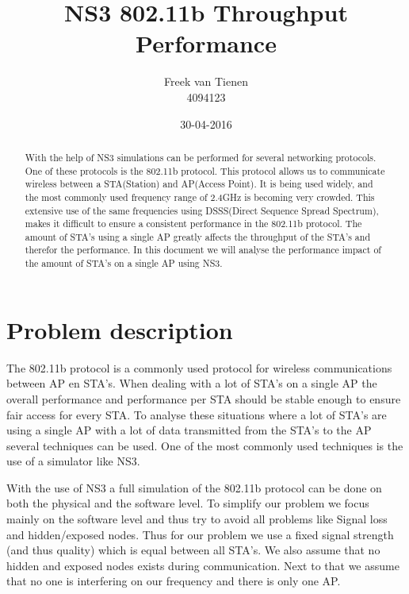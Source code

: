 \documentclass[]{article}
\begin{document}


\title{NS3 802.11b Throughput Performance}
\author{Freek van Tienen \\ 4094123}
\date{30-04-2016}
\maketitle

\begin{abstract}
With the help of NS3 simulations can be performed for several networking protocols.
One of these protocols is the 802.11b protocol.
This protocol allows us to communicate wireless between a STA(Station) and AP(Access Point).
It is being used widely, and the most commonly used frequency range of 2.4GHz is becoming very crowded.
This extensive use of the same frequencies using DSSS(Direct Sequence Spread Spectrum), makes it difficult to ensure a consistent performance in the 802.11b protocol.
The amount of STA's using a single AP greatly affects the throughput of the STA's and therefor the performance.
In this document we will analyse the performance impact of the amount of STA's on a single AP using NS3.
\end{abstract}


\section{Problem description}
The 802.11b protocol is a commonly used protocol for wireless communications between AP en STA's.
When dealing with a lot of STA's on a single AP the overall performance and performance per STA should be stable enough to ensure fair access for every STA.
To analyse these situations where a lot of STA's are using a single AP with a lot of data transmitted from the STA's to the AP several techniques can be used.
One of the most commonly used techniques is the use of a simulator like NS3.

With the use of NS3 a full simulation of the 802.11b protocol can be done on both the physical and the software level.
To simplify our problem we focus mainly on the software level and thus try to avoid all problems like Signal loss and hidden/exposed nodes.
Thus for our problem we use a fixed signal strength (and thus quality) which is equal between all STA's.
We also assume that no hidden and exposed nodes exists during communication.
Next to that we assume that no one is interfering on our frequency and there is only one AP.
\end{document}
